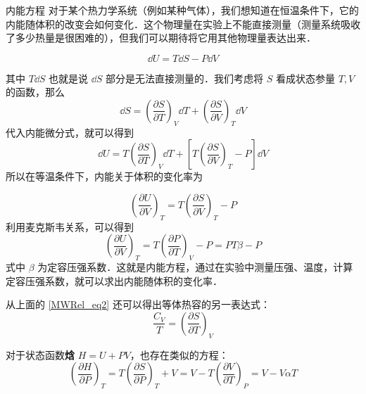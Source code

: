 \begin{example}{内能方程}
对于某个热力学系统（例如某种气体），我们想知道在恒温条件下，它的内能随体积的改变会如何变化．这个物理量在实验上不能直接测量（测量系统吸收了多少热量是很困难的），但我们可以期待将它用其他物理量表达出来．

\begin{equation}
\dd U=T\dd S-P\dd V
\end{equation}

其中 $T\dd S$ 也就是说 $\dd S$ 部分是无法直接测量的．我们考虑将 $S$ 看成状态参量 $T,V$ 的函数，那么 
\begin{equation}
\dd S=\left(\frac{\partial S}{\partial T}\right)_V \dd T+\left(\frac{\partial S}{\partial V}\right)_T \dd V
\end{equation}
代入内能微分式，就可以得到
\begin{equation}\label{MWRel_eq2}
\dd U=T\left(\frac{\partial S}{\partial T}\right)_V\dd T+\left[T\left(\frac{\partial S}{\partial V}\right)_T-P\right]\dd V
\end{equation}
所以在等温条件下，内能关于体积的变化率为

\begin{equation}
\left(\frac{\partial U}{\partial V}\right)_T=T\left(\frac{\partial S}{\partial V}\right)_T-P
\end{equation}
利用麦克斯韦关系，可以得到
\begin{equation}
\left(\frac{\partial U}{\partial V}\right)_T=T\left(\frac{\partial P}{\partial T}\right)_V-P=PT\beta-P
\end{equation}
式中 $\beta$ 为定容压强系数．这就是内能方程，通过在实验中测量压强、温度，计算定容压强系数，就可以求出内能随体积的变化率．

从上面的 \autoref{MWRel_eq2} 还可以得出等体热容的另一表达式：
\begin{equation}
\frac{C_V}{T}=\left(\frac{\partial S}{\partial T}\right)_V
\end{equation}

对于状态函数\textbf{焓} $H=U+PV$，也存在类似的方程：
\begin{equation}\label{MWRel_eq3}
\left(\frac{\partial H}{\partial P}\right)_T=T\left(\frac{\partial S}{\partial P}\right)_T+V
=V-T\left(\frac{\partial V}{\partial T}\right)_P=V-V\alpha T
\end{equation}

\end{example}

